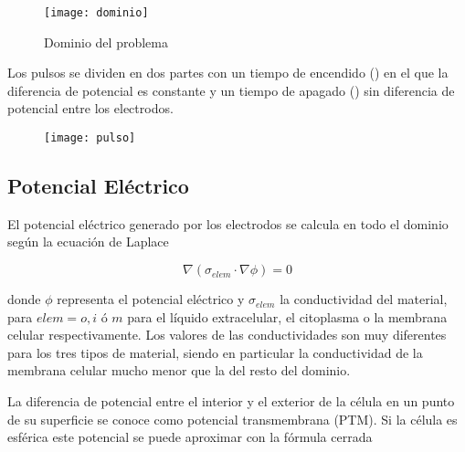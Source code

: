 
\begin{figure}[hb]
	\centering
	{\texttt{[image: dominio]}
	\caption{Dominio del problema}
	\label{fig:dominio}}
\end{figure}

\clearpage

Los pulsos se dividen en dos partes con un tiempo de encendido (\ontime) en el que la diferencia de potencial es constante y un tiempo de apagado (\offtime) sin diferencia de potencial entre los electrodos.

\begin{figure}[h]
	\centering
	\texttt{[image: pulso]}
\end{figure}


\subsection*{Potencial Eléctrico}
El potencial eléctrico generado por los electrodos se calcula en todo el dominio según la ecuación de Laplace \cite{c9-fem-electro}

\begin{equation} \label{eq:poisson}
		\nabla ( \sigma_{elem} \cdot \nabla \phi) = 0 
\end{equation} 

donde $\phi$ representa el potencial eléctrico y $\sigma_{elem}$ la conductividad del material, para $elem = o, i$ ó $m$ para el líquido extracelular, el citoplasma o la membrana celular respectivamente. Los valores de las conductividades son muy diferentes para los tres tipos de material, siendo en particular la conductividad de la membrana celular mucho menor que la del resto del dominio. 

La diferencia de potencial entre el interior y el exterior de la célula en un punto de su superficie se conoce como potencial transmembrana (PTM). Si la célula es esférica este potencial se puede aproximar con la fórmula cerrada \cite{tsong}

